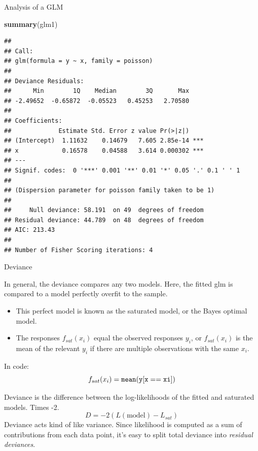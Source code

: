 \documentclass[
  ignorenonframetext,
]{beamer}
\newenvironment{Shaded}{\begin{snugshade}}{\end{snugshade}}
\newcommand{\KeywordTok}[1]{\textcolor[rgb]{0.13,0.29,0.53}{\textbf{#1}}}
\newcommand{\NormalTok}[1]{#1}
\providecommand{\tightlist}{%
  \setlength{\itemsep}{0pt}\setlength{\parskip}{0pt}}
\begin{document}
\begin{frame}[fragile]{Analysis of a GLM}
\protect\hypertarget{analysis-of-a-glm}{}

\scriptsize

\begin{Shaded}
\begin{Highlighting}[]
\KeywordTok{summary}\NormalTok{(glm1)}
\end{Highlighting}
\end{Shaded}

\begin{verbatim}
## 
## Call:
## glm(formula = y ~ x, family = poisson)
## 
## Deviance Residuals: 
##      Min        1Q    Median        3Q       Max  
## -2.49652  -0.65872  -0.05523   0.45253   2.70580  
## 
## Coefficients:
##             Estimate Std. Error z value Pr(>|z|)    
## (Intercept)  1.11632    0.14679   7.605 2.85e-14 ***
## x            0.16578    0.04588   3.614 0.000302 ***
## ---
## Signif. codes:  0 '***' 0.001 '**' 0.01 '*' 0.05 '.' 0.1 ' ' 1
## 
## (Dispersion parameter for poisson family taken to be 1)
## 
##     Null deviance: 58.191  on 49  degrees of freedom
## Residual deviance: 44.789  on 48  degrees of freedom
## AIC: 213.43
## 
## Number of Fisher Scoring iterations: 4
\end{verbatim}

\end{frame}

\begin{frame}{Deviance}
\protect\hypertarget{deviance}{}

In general, the deviance compares any two models. Here, the fitted glm
is compared to a model perfectly overfit to the sample.

\begin{itemize}
\tightlist
\item
  This perfect model is known as the saturated model, or the Bayes
  optimal model.
\item
  The responses \(f_{sat}(x_i)\) equal the observed responses \(y_i\),
  or \(f_{sat}(x_i)\) is the mean of the relevant \(y_i\) if there are
  multiple observations with the same \(x_i\).
\end{itemize}

In code: \[
f_{sat}(x_i)=\tt{mean(y[x==xi])}
\]

Deviance is the difference between the log-likelihoods of the fitted and
saturated models. Times -2. \[
D=-2(L(\text{model})-L_{sat})
\] Deviance acts kind of like variance. Since likelihood is computed as
a sum of contributions from each data point, it's easy to split total
deviance into \emph{residual deviances}.

\end{frame}
\end{document}
